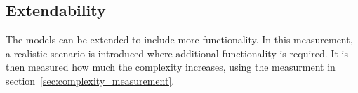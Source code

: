 \subsection{Extendability}
The models can be extended to include more functionality. In this measurement, a realistic scenario is introduced where additional functionality is required. It is then measured how much the complexity increases, using the measurment in section~\ref{sec:complexity_measurement}.

